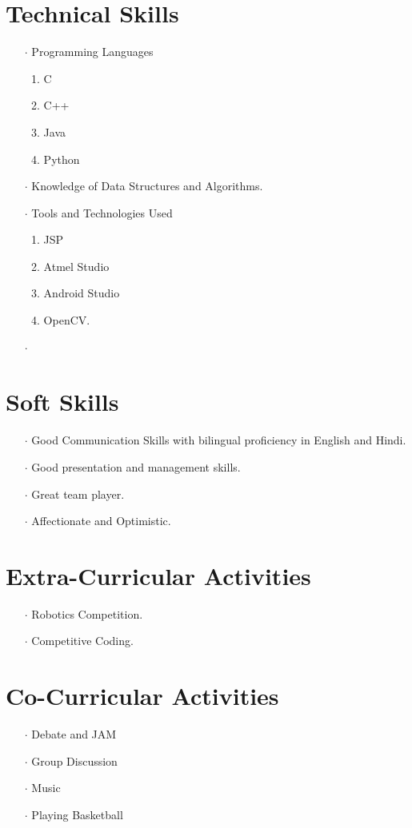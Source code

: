 \documentclass[12pt]{article}
\begin{document}
\section*{Technical Skills}
\begin{itemize}
\item[$\cdot$]Programming Languages
\begin{enumerate}
\item C
\item C++
\item Java
\item Python
\end{enumerate}
\item[$\cdot$]Knowledge of Data Structures and Algorithms.
\item[$\cdot$]Tools and Technologies Used
\begin{enumerate}
\item JSP
\item Atmel Studio
\item Android Studio
\item OpenCV.
\end{enumerate}
\end{itemize}
\begin{itemize}
\item[$\cdot$]
\end{itemize}
\section*{Soft Skills}
\begin{itemize}
\item[$\cdot$] Good Communication Skills with bilingual proficiency in English and Hindi.
\item[$\cdot$]Good presentation and management skills.
\item[$\cdot$]Great team player.
\item[$\cdot$]Affectionate and Optimistic. 
\end{itemize}
\section*{Extra-Curricular Activities}
\begin{itemize}
\item[$\cdot$]Robotics Competition.
\item[$\cdot$]Competitive Coding.
\end{itemize}
\section*{Co-Curricular Activities}
\begin{itemize}
\item[$\cdot$] Debate and JAM
\item[$\cdot$] Group Discussion 
\item[$\cdot$] Music
\item[$\cdot$] Playing Basketball 
\end{itemize}
\end{document}
